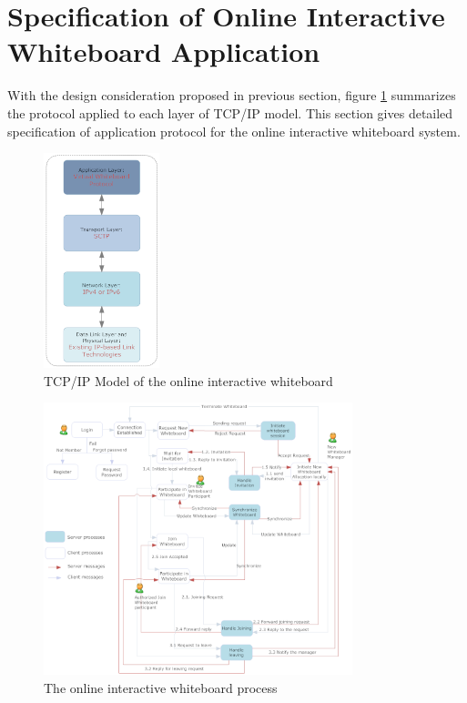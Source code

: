 \documentclass[conference]{IEEEtran}
\begin{document}
\section{Specification of Online Interactive Whiteboard Application}
With the design consideration proposed in previous section, figure \ref{fig:4} summarizes the protocol applied to each layer of TCP/IP model. This section gives detailed specification of application protocol for the online interactive whiteboard system.
 
 \begin{figure}[h]
\begin{center}
\includegraphics[width=0.3\textwidth]{iw_tcpip.png}
\caption{TCP/IP Model of the online interactive whiteboard}
\label{fig:4}
\end{center}
\end{figure}
 \begin{figure}[t]
\begin{center}
\includegraphics[width=0.8\textwidth]{process}
\caption{The online interactive whiteboard process}
\label{fig:3}
\end{center}
\end{figure}
\end{document}
